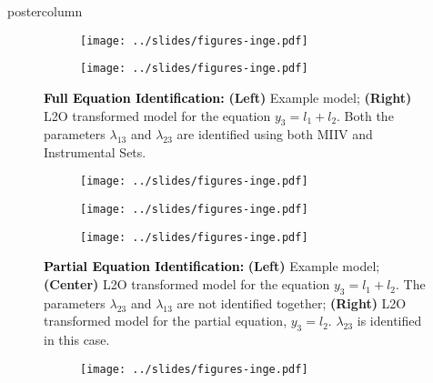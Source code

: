 \documentclass{beamer}
\begin{document}
\begin{frame}
\begin{columns}
\begin{column}{.33\textwidth}
\begin{beamercolorbox}[center]{postercolumn}
\begin{minipage}{.98\textwidth}
{\begin{myblock}{}
						\begin{figure}
							\begin{subfigure}{0.5 \linewidth}
								\centering
								\texttt{[image: ../slides/figures-inge.pdf]}
							\end{subfigure}%
							\begin{subfigure}{0.5 \linewidth}
								\centering
								\texttt{[image: ../slides/figures-inge.pdf]}
							\end{subfigure}
							\caption*{\textbf{\textcolor{black}{Full Equation Identification:}} \textbf{(Left)} Example model; \textbf{(Right)} L2O 
										transformed model for the equation $ y_3 = l_1 + l_2 $. Both the parameters $ \lambda_{13} $ and 
										$ \lambda_{23} $ are identified using both MIIV and Instrumental Sets.}
						\end{figure}
						\vspace{0.9em}
						\begin{figure}
							\begin{subfigure}{0.33 \linewidth}
								\centering
								\texttt{[image: ../slides/figures-inge.pdf]}
							\end{subfigure}%
							\begin{subfigure}{0.33 \linewidth}
								\centering
								\texttt{[image: ../slides/figures-inge.pdf]}
							\end{subfigure}%
							\begin{subfigure}{0.33 \linewidth}
								\centering
								\texttt{[image: ../slides/figures-inge.pdf]}
							\end{subfigure}
							\caption*{\textbf{\textcolor{black}{Partial Equation Identification:}} \textbf{(Left)} Example model; 
										\textbf{(Center)} L2O transformed model for the equation $ y_3 = l_1 + l_2 $. The parameters 
										$ \lambda_{23} $ and $ \lambda_{13} $ are not identified together; \textbf{(Right)} L2O 
										transformed model for the partial equation, $ y_3 = l_2 $. $ \lambda_{23} $ is identified in this case.
										}
						\end{figure}
						\vspace{0.9em}
						\begin{figure}
							\begin{subfigure}{0.5 \linewidth}
								\centering
								\texttt{[image: ../slides/figures-inge.pdf]}
							\end{subfigure}%
							\begin{subfigure}{0.5 \linewidth}

\end{subfigure}
\end{figure}
\end{myblock}}
\end{minipage}
\end{beamercolorbox}
\end{column}
\end{columns}
\end{frame}
\end{document}
